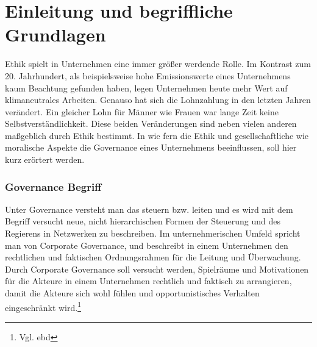 \documentclass[12pt]{article}
\begin{document}
\renewcommand{\mytitle}{Governanceethik und\\moralische Anreize}%
\renewcommand{\myauthor}{Lennart Schulte-Kellinghaus,\\Timo Stovermann}%
\renewcommand{\headheight}{27pt}%



\frontmatter%


\printabbreviations%
\clearpage

\renewcommand{\plaintitle}{Inhaltsverzeichnis}%
{\def\makebox[#1][#2]#3{#3}%
	\tableofcontents
}


\clearpage
\mainmatter%

\part{Einleitung und begriffliche Grundlagen}
Ethik spielt in Unternehmen eine immer größer werdende Rolle. Im Kontrast zum 20. Jahrhundert, als beispielsweise hohe Emissionswerte eines Unternehmens kaum Beachtung gefunden haben, legen Unternehmen heute mehr Wert auf klimaneutrales Arbeiten. Genauso hat sich die Lohnzahlung in den letzten Jahren verändert. Ein gleicher Lohn für Männer wie Frauen war lange Zeit keine Selbstverständlichkeit. Diese beiden Veränderungen sind neben vielen anderen maßgeblich durch Ethik bestimmt. In wie fern die Ethik und gesellschaftliche wie moralische Aspekte die Governance eines Unternehmens beeinflussen, soll hier kurz erörtert werden.

\section{Governance Begriff}
Unter Governance versteht man das steuern bzw. leiten und es wird mit dem Begriff versucht neue, nicht hierarchischen Formen der Steuerung und des Regierens in Netzwerken zu beschreiben. Im unternehmerischen Umfeld spricht man von Corporate Governance, und beschreibt in einem Unternehmen den rechtlichen und faktischen Ordnungsrahmen für die Leitung und Überwachung. Durch Corporate Governance soll versucht werden, Spielräume und Motivationen für die Akteure in einem Unternehmen rechtlich und faktisch zu arrangieren, damit die Akteure sich wohl fühlen und opportunistisches Verhalten eingeschränkt wird.\footnote{Vgl. ebd}
\end{document}
